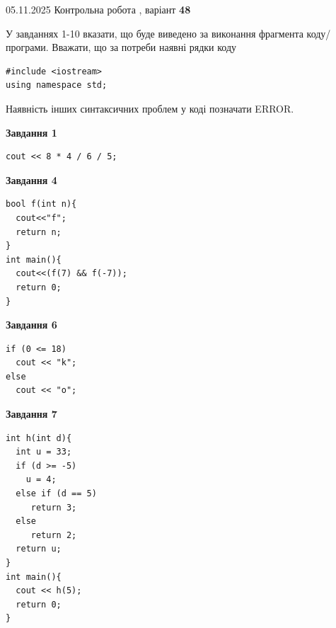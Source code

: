 \documentclass[12pt, ukrainian]{article}
\begin{document}
{\Large{05.11.2025 Контрольна робота , варіант  \No \textbf { 48 }\par}}
{
\begin {large}
У завданнях 1-10 вказати, що буде виведено за виконання фрагмента коду/про\-гра\-ми.
Вважати, що за потреби наявні рядки коду
\begin{verbatim}
#include <iostream>
using namespace std;
\end{verbatim}
Наявність інших синтаксичних проблем у коді позначати ERROR.

\begin{minipage}[t]{7.0cm}

\begin{center}
\textbf{Завдання 1}
\end{center}
\vspace{-8mm}

\begin{verbatim}
cout << 8 * 4 / 6 / 5;
\end{verbatim}



\begin{center}
\textbf{Завдання 4}
\end{center}
\vspace{-8mm}

\begin{verbatim}
bool f(int n){
  cout<<"f";
  return n;
}
int main(){
  cout<<(f(7) && f(-7));
  return 0;
}
\end{verbatim}



\begin{center}
\textbf{Завдання 6}
\end{center}
\vspace{-8mm}

\begin{verbatim}
if (0 <= 18)
  cout << "k";
else
  cout << "o";
\end{verbatim}



\begin{center}
\textbf{Завдання 7}
\end{center}
\vspace{-8mm}

\begin{verbatim}
int h(int d){
  int u = 33;
  if (d >= -5)
    u = 4;
  else if (d == 5)
     return 3;
  else
     return 2;
  return u;
}
int main(){
  cout << h(5);
  return 0;
}
\end{verbatim}


\end{minipage}
\end{large}}
\end{document}
